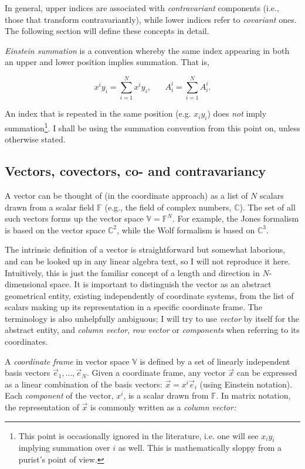 \documentclass{aa}
\begin{document}
In general, upper indices are associated with \emph{contravariant} components (i.e., those that transform contravariantly), while lower indices refer  to \emph{covariant} ones. The following section will define these concepts in detail.

{\em Einstein summation} is a convention whereby the same index appearing in both an upper and lower position implies summation. That is,

\[
  x^i y_i = \sum_{i=1}^{N} x^i y_i, \;\;\;\;\;\; A^i_i = \sum_{i=1}^{N} A^i_i.
\]

An index that is repeated in the same position (e.g. $x_iy_i$) does \emph{not} imply summation\footnote{This point is occasionally ignored in the literature, i.e. one will see $x_i y_i$ implying summation over $i$ as well. This is mathematically sloppy from a purist's point of view.}. I shall be using the summation convention from this point on, unless otherwise stated.


\subsection{Vectors, covectors, co- and contravariancy}
\label{sec:covectors}

A vector can be thought of (in the coordinate approach) as a list of $N$ scalars drawn from a scalar field $\mathbb{F}$ (e.g., the field of complex numbers, $\mathbb{C}$). The set of all such vectors forms up the vector space $\mathbb{V}=\mathbb{F}^N$. For example, the Jones formalism is based on the vector space $\mathbb{C}^2$, while the Wolf formalism is based on $\mathbb{C}^3$. 

The intrinsic definition of a vector is straightforward but somewhat laborious, and can be looked up in any linear algebra text, so I will not reproduce it here. Intuitively, this is just the familiar concept of a length and direction in $N$-dimensional space. It is important to distinguish the vector as an abstract geometrical entity, existing independently of coordinate systems, from the list of scalars making up its representation in a specific coordinate frame. The terminology is also unhelpfully ambiguous; I will try to use \emph{vector} by itself for the abstract entity, and \emph{column vector}, \emph{row vector} or \emph{components} when referring to its coordinates. 

A {\em coordinate frame} in vector space $\mathbb{V}$ is defined by a set of linearly independent basis vectors $\vec e_1,...,\vec e_N$. Given a coordinate frame, any  vector $\vec x$ can be expressed as a linear combination of the basis vectors: $\vec x = x^i \vec e_i$ (using Einstein notation). Each \emph{component} of the vector, $x^i$, is a scalar drawn from $\mathbb{F}$. In matrix notation, the representation of $\vec x$ is commonly written as a \emph{column vector:}
\end{document}
